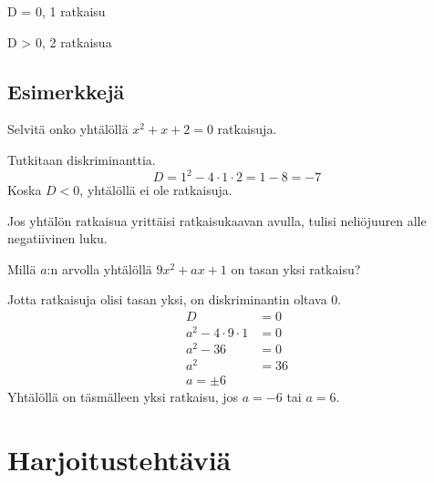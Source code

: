D = 0, 1 ratkaisu
\begin{kuvaajapohja}{1}{-1}{3}{-1}{3}
\end{kuvaajapohja}

D > 0, 2 ratkaisua
\begin{kuvaajapohja}{1}{-1}{3}{-2}{2}
\end{kuvaajapohja}

\subsection*{Esimerkkejä}

\begin{esimerkki}
Selvitä onko yhtälöllä $x^2+x+2=0$ ratkaisuja.

Tutkitaan diskriminanttia.
\[D=1^2-4\cdot 1 \cdot 2 = 1-8 = -7\]
Koska $D<0$, yhtälöllä ei ole ratkaisuja.

Jos yhtälön ratkaisua yrittäisi ratkaisukaavan avulla, tulisi neliöjuuren alle negatiivinen luku.
\end{esimerkki}

\begin{esimerkki}
Millä $a$:n arvolla yhtälöllä $9x^2+ax+1$ on tasan yksi ratkaisu?

Jotta ratkaisuja olisi tasan yksi, on diskriminantin oltava 0.
\begin{align*}
D &=0\\
a^2-4\cdot 9\cdot 1 &= 0\\
a^2-36&=0\\
a^2&=36\\
a=\pm6
\end{align*}
Yhtälöllä on täsmälleen yksi ratkaisu, jos $a=-6$ tai $a=6$.
\end{esimerkki}


\section{Harjoitustehtäviä}

